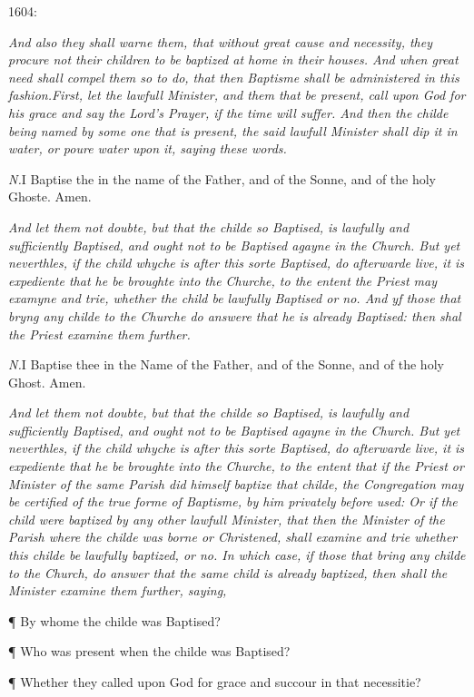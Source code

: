 1604:

\emph{And
also they shall warne them, that without great cause and necessity, they
procure not their children to be baptized at home in their houses. And
when great need shall compel them so to do, that then Baptisme shall be
administered in this fashion.}\emph{First,
let the lawfull Minister, and them that be present, call upon God for
his grace and say the Lord's Prayer, if the time will suffer. And then
the childe being named by some one that is present, the said lawfull Minister
shall dip it in water, or poure water upon it, saying these words.}

\emph{N.}I Baptise
the in the name of the Father, and of the Sonne, and of the holy Ghoste.
Amen.

\emph{And let them not doubte, but that the childe so Baptised, is lawfully
and sufficiently Baptised, and ought not to be Baptised agayne in the
Church. But yet neverthles, if the child whyche is after this sorte Baptised,
do afterwarde live, it is expediente that he be broughte into the Churche,
to the entent the Priest may examyne and trie, whether the child be lawfully
Baptised or no. And yf those that bryng any childe to the Churche do answere
that he is already Baptised: then shal the Priest examine them further.}

\emph{N.}I Baptise
thee in the Name of the Father, and of the Sonne, and of the holy Ghost.
Amen.

\emph{And let them not doubte, but that the childe so Baptised, is lawfully
and sufficiently Baptised, and ought not to be Baptised agayne in the
Church. But yet neverthles, if the child whyche is after this sorte Baptised,
do afterwarde live, it is expediente that he be broughte into the Churche,
to the entent that if the Priest or Minister of the same Parish did himself
baptize that childe, the Congregation may be certified of the true forme
of Baptisme, by him privately before used: Or if the child were baptized
by any other lawfull Minister, that then the Minister of the Parish where
the childe was borne or Christened, shall examine and trie whether this
childe be lawfully baptized, or no. In which case, if those that bring
any childe to the Church, do answer that the same child is already baptized,
then shall the Minister examine them further, saying,}

¶
By whome the childe was Baptised?

¶ Who was present when the childe was Baptised?

¶ Whether they called upon God for grace and succour in that necessitie?

